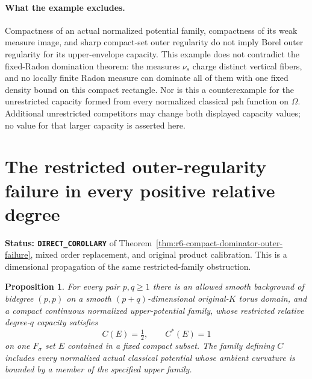 \documentclass[11pt,a4paper]{article}
\numberwithin{equation}{section}
\newtheorem{proposition}[theorem]{Proposition}
\theoremstyle{definition}
\theoremstyle{remark}
\begin{document}
\paragraph{What the example excludes.}
Compactness of an actual normalized potential family, compactness of
its weak measure image, and sharp compact-set outer regularity do
not imply Borel outer regularity for its upper-envelope capacity.
This example does not contradict the fixed-Radon domination theorem:
the measures $\nu_s$ charge distinct vertical fibers, and no locally
finite Radon measure can dominate all of them with one fixed density
bound on this compact rectangle. Nor is this a counterexample for
the unrestricted capacity formed from every normalized classical psh
function on $\Omega$. Additional unrestricted competitors may change
both displayed capacity values; no value for that larger capacity
is asserted here.



\section{The restricted outer-regularity failure in every positive relative degree}
\label{sec:r6-compact-dominator-all-degrees}

\noindent\textbf{Status: \texttt{DIRECT\_COROLLARY}} of
Theorem~\ref{thm:r6-compact-dominator-outer-failure}, mixed order
replacement, and original product calibration. This is a dimensional
propagation of the same restricted-family obstruction.

\begin{proposition}
\label{prop:r6-compact-dominator-all-degrees}
For every pair $p,q\ge1$ there is an allowed smooth background of
bidegree $(p,p)$ on a smooth $(p+q)$-dimensional original-$K$ torus
domain, and a compact continuous normalized upper-potential family,
whose restricted relative degree-$q$ capacity satisfies
\[
                            C(E)=\tfrac12,
                      \qquad C^*(E)=1
\]
on one $F_\sigma$ set $E$ contained in a fixed compact subset.
The family defining $C$ includes every normalized actual classical
potential whose ambient curvature is bounded by a member of the
specified upper family.
\end{proposition}
\end{document}
